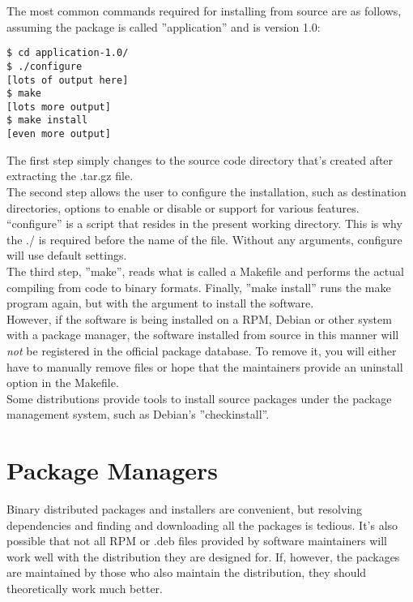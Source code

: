 The most common commands required for installing from source are as follows, assuming the package is called ''application'' and is version 1.0:

\begin{verbatim}
$ cd application-1.0/
$ ./configure
[lots of output here]
$ make
[lots more output]
$ make install
[even more output]
\end{verbatim}

The first step simply changes to the source code directory that's created after extracting the .tar.gz file.\\

The second step allows the user to configure the installation, such as destination directories, options to enable or disable or support for various features.  ``configure'' is a script that resides in the present working directory.  This is why the ./ is required before the name of the file.  Without any arguments, configure will use default settings.\\

The third step, ''make'', reads what is called a Makefile and performs the actual compiling from code to binary formats.  Finally, ''make install'' runs the make program again, but with the argument to install the software.\\

However, if the software is being installed on a RPM, Debian or other system with a package manager, the software installed from source in this manner will \textit{not} be registered in the official package database.  To remove it, you will either have to manually remove files or hope that the maintainers provide an uninstall option in the Makefile.\\

Some distributions provide tools to install source packages under the package management system, such as Debian's ''checkinstall''.


\section{Package Managers}

Binary distributed packages and installers are convenient, but resolving dependencies and finding and downloading all the packages is tedious.  It's also possible that not all RPM or .deb files provided by software maintainers will work well with the distribution they are designed for.  If, however, the packages are maintained by those who also maintain the distribution, they should theoretically work much better.\\

